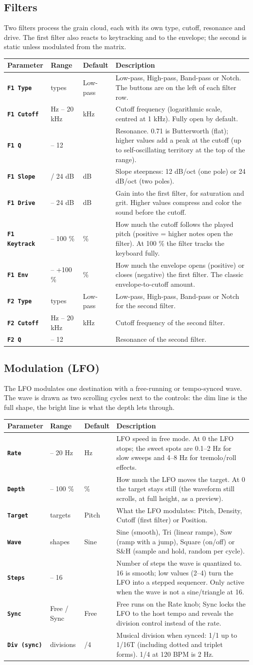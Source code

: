 \documentclass[11pt,a4paper]{article}
\makeatletter
\newcommand{\paramtable}[1]{%
  {\setlength{\tabcolsep}{3.5pt}\small
  \begin{tabular}{@{}>{\raggedright\arraybackslash}p{26mm}>{\raggedright\arraybackslash}p{25mm}>{\raggedright\arraybackslash}p{18mm}>{\raggedright\arraybackslash}p{\dimexpr\textwidth-69mm-21pt\relax}@{}}
  \toprule
  \textbf{Parameter} & \textbf{Range} & \textbf{Default} & \textbf{Description} \\
  \midrule
  #1
  \bottomrule
  \end{tabular}}}
\newcommand{\param}[4]{\texttt{\textbf{#1}} & #2 & #3 & #4 \\}
\makeatother
\begin{document}
\subsection{Filters}
Two filters process the grain cloud, each with its own type, cutoff,
resonance and drive. The first filter also reacts to keytracking and to the
envelope; the second is static unless modulated from the matrix.

\paramtable{
\param{F1 Type}{4 types}{Low-pass}{Low-pass, High-pass, Band-pass or Notch. The buttons are on the left of each filter row.}
\param{F1 Cutoff}{20 Hz -- 20 kHz}{20 kHz}{Cutoff frequency (logarithmic scale, centred at 1 kHz). Fully open by default.}
\param{F1 Q}{0.5 -- 12}{0.71}{Resonance. 0.71 is Butterworth (flat); higher values add a peak at the cutoff (up to self-oscillating territory at the top of the range).}
\param{F1 Slope}{12 / 24 dB}{12 dB}{Slope steepness: 12 dB/oct (one pole) or 24 dB/oct (two poles).}
\param{F1 Drive}{0 -- 24 dB}{0 dB}{Gain into the first filter, for saturation and grit. Higher values compress and color the sound before the cutoff.}
\param{F1 Keytrack}{0 -- 100 \%}{0 \%}{How much the cutoff follows the played pitch (positive = higher notes open the filter). At 100 \% the filter tracks the keyboard fully.}
\param{F1 Env}{-100 -- +100 \%}{0 \%}{How much the envelope opens (positive) or closes (negative) the first filter. The classic envelope-to-cutoff amount.}
\param{F2 Type}{4 types}{Low-pass}{Low-pass, High-pass, Band-pass or Notch for the second filter.}
\param{F2 Cutoff}{20 Hz -- 20 kHz}{20 kHz}{Cutoff frequency of the second filter.}
\param{F2 Q}{0.5 -- 12}{0.71}{Resonance of the second filter.}
}

\subsection{Modulation (LFO)}
The LFO modulates one destination with a free-running or tempo-synced
wave. The wave is drawn as two scrolling cycles next to the controls: the dim
line is the full shape, the bright line is what the depth lets through.

\paramtable{
\param{Rate}{0 -- 20 Hz}{1.0 Hz}{LFO speed in free mode. At 0 the LFO stops; the sweet spots are 0.1--2 Hz for slow sweeps and 4--8 Hz for tremolo/roll effects.}
\param{Depth}{0 -- 100 \%}{0 \%}{How much the LFO moves the target. At 0 the target stays still (the waveform still scrolls, at full height, as a preview).}
\param{Target}{4 targets}{Pitch}{What the LFO modulates: Pitch, Density, Cutoff (first filter) or Position.}
\param{Wave}{5 shapes}{Sine}{Sine (smooth), Tri (linear ramps), Saw (ramp with a jump), Square (on/off) or S\&H (sample and hold, random per cycle).}
\param{Steps}{1 -- 16}{16}{Number of steps the wave is quantized to. 16 is smooth; low values (2--4) turn the LFO into a stepped sequencer. Only active when the wave is not a sine/triangle at 16.}
\param{Sync}{Free / Sync}{Free}{Free runs on the Rate knob; Sync locks the LFO to the host tempo and reveals the division control instead of the rate.}
\param{Div (sync)}{12 divisions}{1/4}{Musical division when synced: 1/1 up to 1/16T (including dotted and triplet forms). 1/4 at 120 BPM is 2 Hz.}
}
\end{document}
